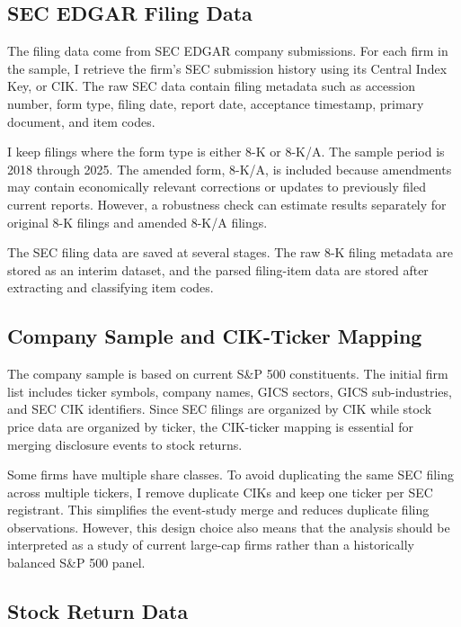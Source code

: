\documentclass[12pt]{article}
\begin{document}
	\subsection{SEC EDGAR Filing Data}
	
	The filing data come from SEC EDGAR company submissions. For each firm in the sample, I retrieve the firm's SEC submission history using its Central Index Key, or CIK. The raw SEC data contain filing metadata such as accession number, form type, filing date, report date, acceptance timestamp, primary document, and item codes.
	
	I keep filings where the form type is either 8-K or 8-K/A. The sample period is 2018 through 2025. The amended form, 8-K/A, is included because amendments may contain economically relevant corrections or updates to previously filed current reports. However, a robustness check can estimate results separately for original 8-K filings and amended 8-K/A filings.
	
	The SEC filing data are saved at several stages. The raw 8-K filing metadata are stored as an interim dataset, and the parsed filing-item data are stored after extracting and classifying item codes.
	
	\subsection{Company Sample and CIK-Ticker Mapping}
	
	The company sample is based on current S\&P 500 constituents. The initial firm list includes ticker symbols, company names, GICS sectors, GICS sub-industries, and SEC CIK identifiers. Since SEC filings are organized by CIK while stock price data are organized by ticker, the CIK-ticker mapping is essential for merging disclosure events to stock returns.
	
	Some firms have multiple share classes. To avoid duplicating the same SEC filing across multiple tickers, I remove duplicate CIKs and keep one ticker per SEC registrant. This simplifies the event-study merge and reduces duplicate filing observations. However, this design choice also means that the analysis should be interpreted as a study of current large-cap firms rather than a historically balanced S\&P 500 panel.
	
	\subsection{Stock Return Data}
	
\end{document}
